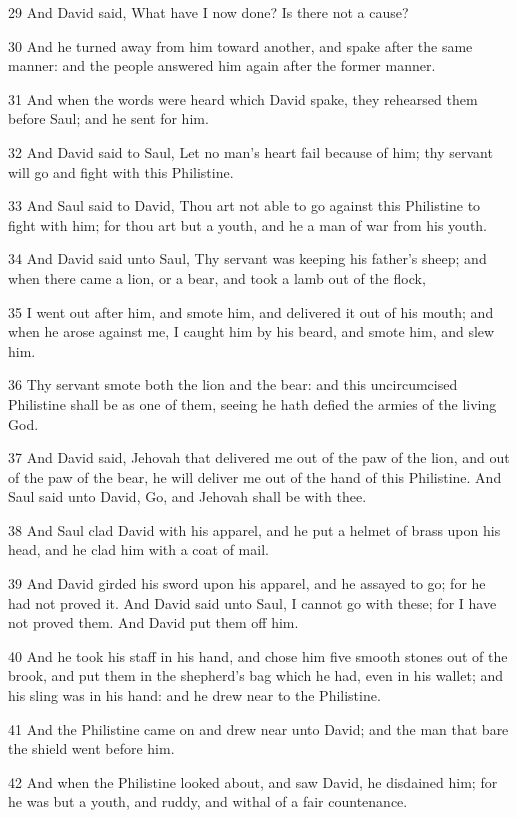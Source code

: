 \par 29 And David said, What have I now done? Is there not a cause?
\par 30 And he turned away from him toward another, and spake after the same manner: and the people answered him again after the former manner.
\par 31 And when the words were heard which David spake, they rehearsed them before Saul; and he sent for him.
\par 32 And David said to Saul, Let no man's heart fail because of him; thy servant will go and fight with this Philistine.
\par 33 And Saul said to David, Thou art not able to go against this Philistine to fight with him; for thou art but a youth, and he a man of war from his youth.
\par 34 And David said unto Saul, Thy servant was keeping his father's sheep; and when there came a lion, or a bear, and took a lamb out of the flock,
\par 35 I went out after him, and smote him, and delivered it out of his mouth; and when he arose against me, I caught him by his beard, and smote him, and slew him.
\par 36 Thy servant smote both the lion and the bear: and this uncircumcised Philistine shall be as one of them, seeing he hath defied the armies of the living God.
\par 37 And David said, Jehovah that delivered me out of the paw of the lion, and out of the paw of the bear, he will deliver me out of the hand of this Philistine. And Saul said unto David, Go, and Jehovah shall be with thee.
\par 38 And Saul clad David with his apparel, and he put a helmet of brass upon his head, and he clad him with a coat of mail.
\par 39 And David girded his sword upon his apparel, and he assayed to go; for he had not proved it. And David said unto Saul, I cannot go with these; for I have not proved them. And David put them off him.
\par 40 And he took his staff in his hand, and chose him five smooth stones out of the brook, and put them in the shepherd's bag which he had, even in his wallet; and his sling was in his hand: and he drew near to the Philistine.
\par 41 And the Philistine came on and drew near unto David; and the man that bare the shield went before him.
\par 42 And when the Philistine looked about, and saw David, he disdained him; for he was but a youth, and ruddy, and withal of a fair countenance.
